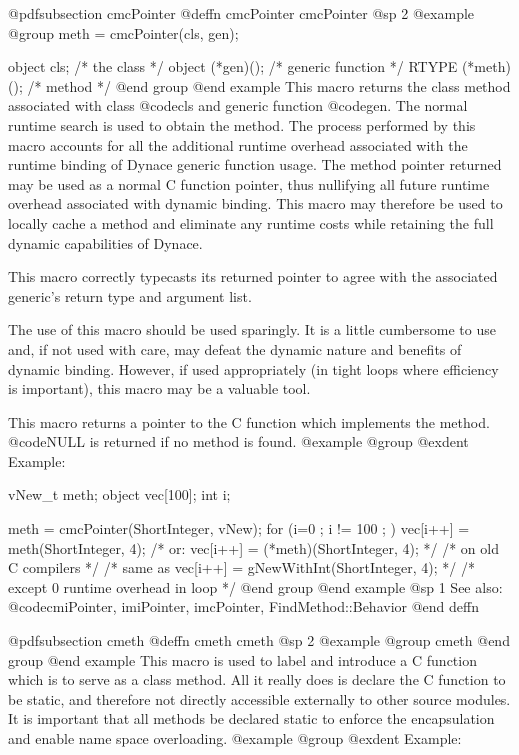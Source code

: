 {{{{@pdfsubsection {cmcPointer}
@deffn {cmcPointer} cmcPointer
@sp 2
@example
@group
meth = cmcPointer(cls, gen);

object  cls;            /*  the class           */
object  (*gen)();       /*  generic function    */
RTYPE   (*meth)();      /*  method              */
@end group
@end example
This macro returns the class method associated with class @code{cls} and
generic function @code{gen}.  The normal runtime search is used to
obtain the method.  The process performed by this macro accounts for all
the additional runtime overhead associated with the runtime binding of
Dynace generic function usage.  The method pointer returned may be used as
a normal C function pointer, thus nullifying all future runtime overhead
associated with dynamic binding.  This macro may therefore be used to
locally cache a method and eliminate any runtime costs while retaining
the full dynamic capabilities of Dynace.

This macro correctly typecasts its returned pointer to agree with
the associated generic's return type and argument list.

The use of this macro should be used sparingly.  It is a little
cumbersome to use and, if not used with care, may defeat the dynamic
nature and benefits of dynamic binding.  However, if used appropriately
(in tight loops where efficiency is important), this macro may be
a valuable tool.

This macro returns a pointer to the C function which implements the method.
@code{NULL} is returned if no method is found.
@example
@group
@exdent Example:

vNew_t    meth;
object  vec[100];
int     i;

meth = cmcPointer(ShortInteger, vNew);
for (i=0 ; i != 100 ; )
       vec[i++] = meth(ShortInteger, 4);
/* or: vec[i++] = (*meth)(ShortInteger, 4); */
       /*  on old C compilers */
/* same as vec[i++] = gNewWithInt(ShortInteger, 4);  */
/* except 0 runtime overhead in loop          */
@end group
@end example
@sp 1
See also:  @code{cmiPointer, imiPointer, imcPointer, FindMethod::Behavior}
@end deffn










@pdfsubsection {cmeth}
@deffn {cmeth} cmeth
@sp 2
@example
@group
cmeth
@end group
@end example
This macro is used to label and introduce a C function which is to serve
as a class method.  All it really does is declare the C function to be
static, and therefore not directly accessible externally to other source
modules.  It is important that all methods be declared static to enforce
the encapsulation and enable name space overloading.
@example
@group
@exdent Example:

}}}}
